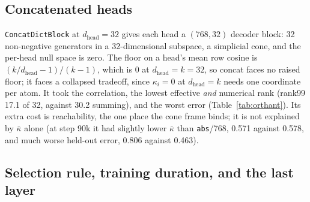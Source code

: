 \subsection{Concatenated heads}
\label{sec:concatgeom}

\texttt{ConcatDictBlock} at $d_{\text{head}}{=}32$ gives each head a
$(768,32)$ decoder block: 32 non-negative generators in a 32-dimensional
subspace, a simplicial cone, and the per-head null space is zero. The
floor on a head's mean row cosine is $(k/d_{\text{head}} - 1)/(k-1)$,
which is 0 at $d_{\text{head}}{=}k{=}32$, so concat faces no raised
floor; it faces a collapsed tradeoff, since $\kappa_i{=}0$ at
$d_{\text{head}}{=}k$ needs one coordinate per atom. It took the
correlation, the lowest effective \emph{and} numerical rank (rank99 17.1
of 32, against 30.2 summing), and the worst error
(Table~\ref{tab:orthant}). Its extra cost is reachability, the one place
the cone frame binds; it is not explained by $\bar\kappa$ alone (at step
90k it had slightly lower $\bar\kappa$ than \texttt{abs}/768,
0.571 against 0.578, and much worse held-out error, 0.806 against 0.463).

\subsection{Selection rule, training duration, and the last layer}
\label{sec:lastlayer}

